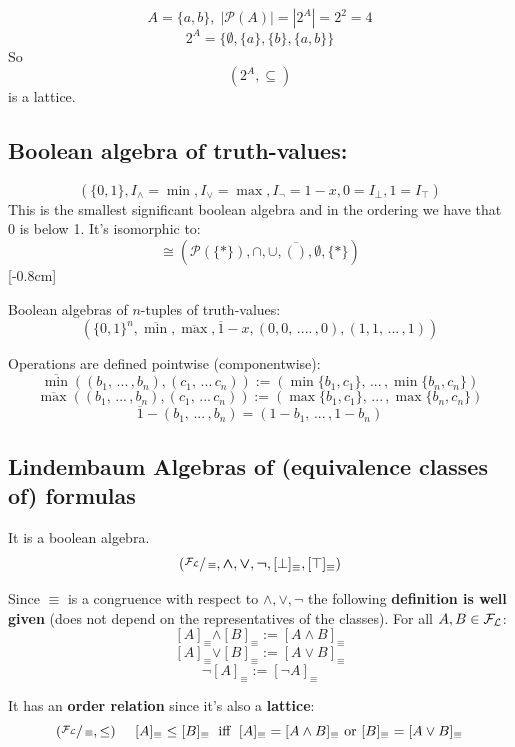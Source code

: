 	\begin{example}
	$$A = \{a,b\}, \; |\mathcal{P} (A)| = |2^A| = 2^2 = 4$$
	$$ 2^A = \{\emptyset, \{a\}, \{b\}, \{a,b\}\} $$
	So
	$$ (2^A, \subseteq)$$
	is a lattice.
	\end{example}

	\subsection{Boolean algebra of truth-values:}
	$$ (\{0,1\}, I_\wedge = \min, I_\vee = \max, I_\neg = 1-x, 0 = I_\bot, 1 = I_\top) $$
	This is the smallest significant boolean algebra and in the ordering we have that 0 is below 1.
	\noindent
	It's isomorphic to:
	$$ \cong (\mathcal{P}(\{\ast\}), \cap, \cup, \overline{()}, \emptyset, \{\ast\}) $$ [-0.8cm]

	\vspace{-0.4cm}

	\noindent
	Boolean algebras of $n$-tuples of truth-values:
	$$ (\{0,1\}^n, \overline{\min}, \overline{\max}, \overline{1} - x, (0,0, \, .... \, , 0), (1,1, \, ... \, , 1)) $$

	\noindent
	Operations are defined pointwise (componentwise):
	$$ \overline{\min} ((b_1, \, ... \, , b_n), (c_1, \, ... \, c_n)) := (\min \{b_1, c_1\}, \, ... \, , \min \{b_n, c_n\})$$
	$$ \overline{\max} ((b_1, \, ... \, , b_n), (c_1, \, ... \, c_n)) := (\max \{b_1, c_1\}, \, ... \, , \max \{b_n, c_n\})$$
	$$ \overline{1} - (b_1, \, ... \, , b_n) = (1-b_1, \, ... \, , 1-b_n) $$

	\subsection{Lindembaum Algebras of (equivalence classes of) formulas}
	It is a boolean algebra.
	$$ (\sfrac{\mathcal{F}_\mathcal{L}}{\equiv}, \bm{\wedge}, \bm{\vee}, \bm{\neg}, [\bot]_\equiv, [\top]_\equiv) $$

	Since $\equiv$ is a congruence with respect to $\wedge, \vee, \neg$ the following \textbf{definition is well given} (does not depend on the representatives of the classes). For all $A, B \in \mathcal{F}_\mathcal{L}$:
	$$ [A]_\equiv \bm{\wedge} [B]_\equiv := [A \wedge B]_\equiv $$
	$$ [A]_\equiv \bm{\vee} [B]_\equiv := [A \vee B]_\equiv $$
	$$ \neg [A]_\equiv := [\neg A]_\equiv $$

	\noindent
	It has an \textbf{order relation} since it's also a \textbf{lattice}:
	$$ (\sfrac{\mathcal{F}_\mathcal{L}}{\equiv}, \leq) \;\;\;\;\; [A]_\equiv \leq [B]_\equiv  \; \text{ iff } \; [A]_\equiv = [A \wedge B]_\equiv \text{ or } [B]_\equiv = [A \vee B]_\equiv $$

